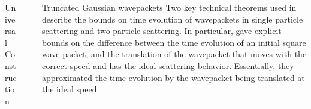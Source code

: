 \documentclass{beamer}
\newlength{\sepwid}
\newlength{\onecolwid}
\begin{document}
\begin{frame}[t]
\begin{columns}[t]
\begin{column}{\onecolwid}
\begin{block}{Universal Construction}
\begin{figure}
\end{figure}    
    
    
  \end{block}

\end{column}
\begin{column}{\sepwid}\end{column}



\begin{column}{\onecolwid}
  \begin{block}{Truncated Gaussian wavepackets}
Two key technical theorems used in \cite{MPQW} describe the bounds on time evolution of wavepackets in single particle scattering and two particle scattering.  In particular, \cite{MPQW} gave explicit bounds on the difference between the time evolution of an initial square wave packet, and the translation of the wavepacket that moves with the correct speed and has the ideal scattering behavior.  Essentially, they approximated the time evolution by the wavepacket being translated at the ideal speed.


\end{block}
\end{column}
\end{columns}
\end{frame}
\end{document}
